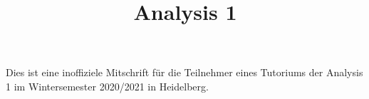 \documentclass{scrartcl}[a4paper, 12pt]
\title{Analysis 1}
\author{}
\date{}
\begin{document}
\maketitle 
    Dies ist eine inoffiziele Mitschrift für die Teilnehmer eines Tutoriums der Analysis 1 im Wintersemester 2020/2021 in Heidelberg.
    
    
    
    
\end{document}
